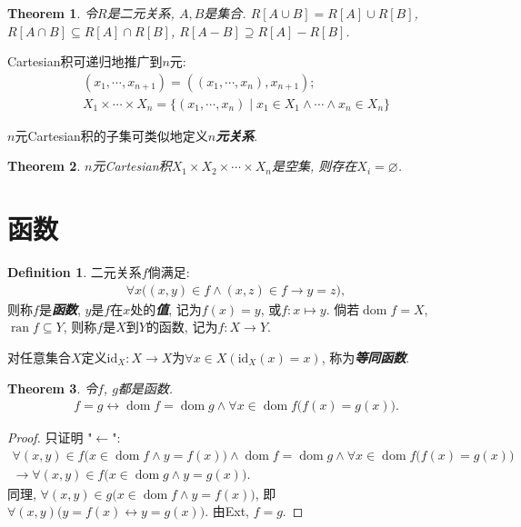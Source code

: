 \documentclass[openany]{ctexbook}
\newcommand*{\indexbf}[1]{\emph{\textbf{#1}}\index{#1}} %
\theoremstyle{plain}
\newtheorem{theorem}{Theorem}[section] %
\theoremstyle{definition}
\newtheorem{definition}{Definition}[section] %
\newcommand*{\id}{\mathrm{id}}
\DeclareMathOperator{\dom}{dom}
\DeclareMathOperator{\ran}{ran}
\begin{document}
\begin{theorem}
令$R$是二元关系, $A,B$是集合. $R[ A\cup B] = R[A] \cup R[B]$, $R[ A\cap B] \subseteq R[A]\cap R[B]$, $R[A -B] \supseteq R[A] - R[B]$.
\end{theorem}

Cartesian积可递归地推广到$n$元: 
\begin{align}
	(x_1,\cdots,x_{n+1}) = ( (x_1,\cdots,x_n),x_{n+1});\\
	X_1\times\cdots\times X_n = \{ (x_1,\cdots, x_n)\mid x_1\in X_1\wedge\cdots \wedge x_n\in X_n\} 
\end{align}

$n$元Cartesian积的子集可类似地定义\indexbf{$n$元关系}.

\begin{theorem}
$n$元Cartesian积$X_1\times X_2\times \cdots \times X_n$是空集, 则存在$X_i = \varnothing$.
\end{theorem}

\section{函数}

\begin{definition}\label{function}
二元关系$f$倘满足: 
\begin{align*}
	\forall x\big(
		(x,y)\in f\wedge (x,z)\in f \to y=z\big),
\end{align*}
则称$f$是\indexbf{函数}, $y$是$f$在$x$处的\indexbf{值}, 记为$f(x) = y$, 或$f\colon x\mapsto y$. 倘若$\dom f = X$, $\ran f \subseteq Y$, 则称$f$是$X$到$Y$的函数, 记为$f\colon X\to Y$. 
\end{definition}

对任意集合$X$定义$\id _X \colon X\to X$为$\forall x\in X(\id _X(x)=x)$, 称为\indexbf{等同函数}.

\begin{theorem}\label{equality_function}
令$f$, $g$都是函数.
\begin{align*}
	f=g\leftrightarrow 
		\dom f=\dom g \wedge \forall x\in \dom f \big(
			f(x)=g(x)\big). 
\end{align*}
\end{theorem}
\begin{proof}
只证明 "$\leftarrow$":
\begin{align*}
	\forall (x,y)\in f  \big(
		x\in \dom f\wedge y=f(x)\big) \wedge
		\dom f=\dom g \wedge \forall x\in \dom f \big(
			f(x)=g(x)\big) &\\\rightarrow
		\forall (x,y)\in f\big(
			x\in \dom g\wedge y=g(x)\big).
	\qquad\qquad&
\end{align*}
同理, $
\forall (x,y)\in g\big(
	x\in \dom f\wedge y=f(x)\big)$, 
即$\forall (x,y) \big(
	y=f(x)\leftrightarrow y=g(x)\big)$. 由Ext, $f=g$.
\end{proof}
\end{document}
